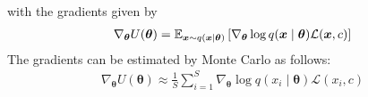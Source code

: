 \begin{itemize}
with the gradients given by
\begin{align}\label{eq:grad_estimator}
\nabla_{\boldsymbol{\theta}} U(\boldsymbol{\theta}) =\mathbb{E}_{\boldsymbol{x} \sim q(\boldsymbol{x} \mid \boldsymbol{\theta})}\left[\nabla_{\boldsymbol{\theta}} \log q(\boldsymbol{x} \mid \boldsymbol{\theta}) \mathcal{L}(\boldsymbol{x},c)\right]
\end{align}
%
The gradients can be estimated by Monte Carlo as follows:
\begin{align}\label{eq:VO_grad_estimator}
\nabla_{\boldsymbol{\theta}} U(\boldsymbol{\theta}) \approx 
\frac{1}{S} \sum_{i=1}^{S}
\nabla_{\boldsymbol{\theta}} \log q(x_i \mid \boldsymbol{\theta}) \mathcal{L}(x_i,c)
\end{align}


\end{itemize}
